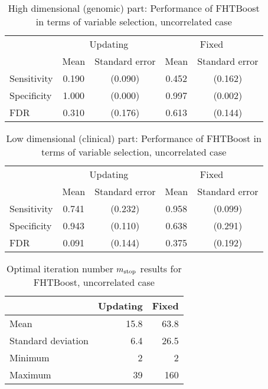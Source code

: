 \begin{table}
\caption{High dimensional (genomic) part: Performance of FHTBoost in terms of variable selection, uncorrelated case}
\label{table:uncorrelated-y0}
\centering
\begin{tabular}{l|cc|cc}
\toprule
& \multicolumn{2}{c}{Updating} & \multicolumn{2}{c}{Fixed} \\
& Mean & Standard error & Mean & Standard error \\
\hline
Sensitivity & 0.190 & (0.090) & 0.452 & (0.162) \\
Specificity & 1.000 & (0.000) & 0.997 & (0.002) \\
FDR         & 0.310 & (0.176) & 0.613 & (0.144) \\
\bottomrule
\end{tabular}
\end{table}

\begin{table}
\caption{Low dimensional (clinical) part: Performance of FHTBoost in terms of variable selection, uncorrelated case}
\label{table:uncorrelated-mu}
\centering
\begin{tabular}{l|cc|cc}
\toprule
& \multicolumn{2}{c}{Updating} & \multicolumn{2}{c}{Fixed} \\
& Mean & Standard error & Mean & Standard error \\
\hline
Sensitivity & 0.741 & (0.232) & 0.958 & (0.099) \\
Specificity & 0.943 & (0.110) & 0.638 & (0.291) \\
FDR         & 0.091 & (0.144) & 0.375 & (0.192) \\
\bottomrule
\end{tabular}
\end{table}

\begin{table}
\caption{Optimal iteration number $m_{\text{stop}}$ results for FHTBoost, uncorrelated case}
\label{table:uncorrelated-mstop}
\centering
\begin{tabular}{l|rr}
\toprule
& Updating & Fixed \\
\hline
Mean               &  15.8  &  63.8  \\
Standard deviation &   6.4  &  26.5  \\
Minimum            &     2  &     2  \\
Maximum            &    39  &   160  \\
\bottomrule
\end{tabular}
\end{table}


